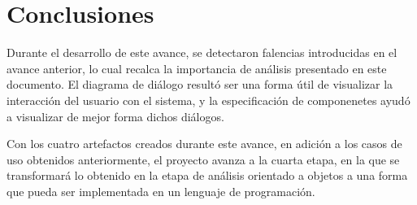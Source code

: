 \section{Conclusiones}
Durante el desarrollo de este avance, se detectaron falencias introducidas en el avance anterior, lo cual recalca la importancia de análisis presentado en este documento. El diagrama de diálogo resultó ser una forma útil de visualizar la interacción del usuario con el sistema, y la especificación de componenetes ayudó a visualizar de mejor forma dichos diálogos.

Con los cuatro artefactos creados durante este avance, en adición a los casos de uso obtenidos anteriormente, el proyecto avanza a la cuarta etapa, en la que se transformará lo obtenido en la etapa de análisis orientado a objetos a una forma que pueda ser implementada en un lenguaje de programación.
